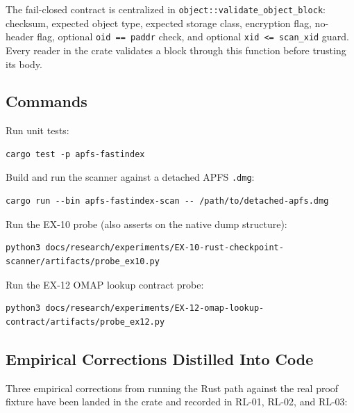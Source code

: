 The fail-closed contract is centralized in
\texttt{object::validate\_object\_block}: checksum, expected object type,
expected storage class, encryption flag, no-header flag, optional
\texttt{oid == paddr} check, and optional \texttt{xid <= scan\_xid} guard.
Every reader in the crate validates a block through this function before
trusting its body.

\subsection{Commands}

Run unit tests:

\begin{verbatim}
cargo test -p apfs-fastindex
\end{verbatim}

Build and run the scanner against a detached APFS \texttt{.dmg}:

\begin{verbatim}
cargo run --bin apfs-fastindex-scan -- /path/to/detached-apfs.dmg
\end{verbatim}

Run the EX-10 probe (also asserts on the native dump structure):

\begin{verbatim}
python3 docs/research/experiments/EX-10-rust-checkpoint-scanner/artifacts/probe_ex10.py
\end{verbatim}

Run the EX-12 OMAP lookup contract probe:

\begin{verbatim}
python3 docs/research/experiments/EX-12-omap-lookup-contract/artifacts/probe_ex12.py
\end{verbatim}

\subsection{Empirical Corrections Distilled Into Code}

Three empirical corrections from running the Rust path against the real proof
fixture have been landed in the crate and recorded in RL-01, RL-02, and RL-03:

